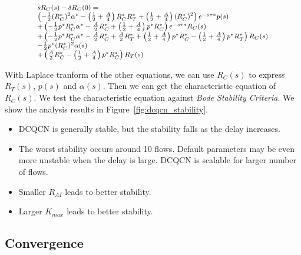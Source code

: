 \begin{equation}
\small
\begin{array}{l}
s{R_C}(s) - \delta {R_C}(0) = \\
\left( { - \frac{1}{2}{{(R_C^*)}^2}{\alpha ^*} - \left( {\frac{1}{2} + \frac{A}{4}} \right)R_C^*R_T^* + \left( {\frac{1}{2} + \frac{A}{4}} \right){{(R_C^*)}^2}} \right){e^{ - s\tau *}}p(s)\\
 + \left( { - \frac{1}{2}{p^*}R_C^*{\alpha ^*} - \frac{A}{2}R_C^* + \left( {\frac{1}{2} + \frac{A}{4}} \right){p^*}R_C^*} \right){e^{ - s\tau *}}{R_C}(s)\\
 + \left( { - \frac{1}{2}{p^*}R_C^*{\alpha ^*} - \frac{A}{2}R_C^* + \frac{A}{2}R_T^* + \left( {\frac{1}{2} + \frac{A}{4}} \right){p^*}R_C^* - \left( {\frac{1}{2} + \frac{A}{4}} \right){p^*}R_T^*} \right){R_C}(s)\\
 - \frac{1}{2}{p^*}{(R_C^*)^2}\alpha (s)\\
 + \left( {\frac{A}{2}R_C^* - \left( {\frac{1}{2} + \frac{A}{4}} \right){p^*}R_C^*} \right){R_T}(s)
\end{array}
\end{equation}

With Laplace tranform of the other equations, we can use ${R_C}(s)$ to express ${R_T}(s)$, $p(s)$ and $\alpha (s)$.
Then we can get the characteristic equation of ${R_C}(s)$. We test the characteristic equation against {\em Bode Stability
Criteria}. We show the analysis results in Figure~\ref{fig:dcqcn_stability}.

\begin{itemize}
\item DCQCN is generally stable, but the stability falls as the delay increases.
\item The worst stability occurs around 10 flows. Default parameters may be even more 
		unstable when the delay is large. DCQCN is scalable for larger number of flows. 
\item Smaller $R_{AI}$ leads to better stability.
\item Larger $K_{max}$ leads to better stability.

\end{itemize}

\subsection{Convergence}
